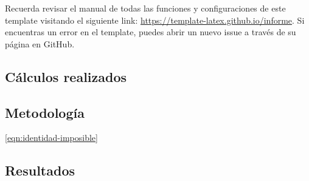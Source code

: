 	Recuerda revisar el manual de todas las funciones y configuraciones de este template visitando el siguiente link: \url{https://template-latex.github.io/informe}. Si encuentras un error en el template, puedes abrir un nuevo issue a través de su página en GitHub.


\clearpage



\begin{appendixd}

	\section{Cálculos realizados}

	\subsection{Metodología}

	\lipsum[1] \eqref{eqn:identidad-imposible}


	\subsection{Resultados}

	\lipsum[10]


\end{appendixd}
